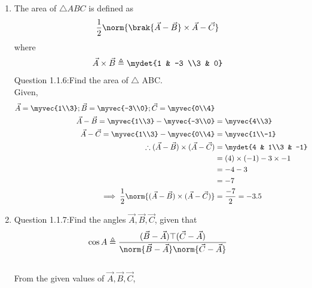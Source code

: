 \documentclass[11pt]{book}
\begin{document}
\begin{enumerate}[label=\thesection.\arabic*.,ref=\thesection.\theenumi]
\item The area of $\triangle ABC$ is defined as
		\begin{align}
			\frac{1}{2}\norm{{\brak{\vec{A}-\vec{B}}\times {\vec{A}-\vec{C}}}}
		\end{align}
		where
		\begin{align}
			\vec{A}\times\vec{B} \triangleq \mydet{1 & -3 \\3 & 0}
		\end{align}
Question 1.1.6:Find the area of $\triangle$ ABC.\\
\solution
Given,
\begin{align}
\vec{A} = \myvec{1\\3};
\vec{B} = \myvec{-3\\0};
\vec{C} = \myvec{0\\4}\\
\vec{A}-\vec{B}=\myvec{1\\3}-\myvec{-3\\0}&=\myvec{4\\3}\\
\vec{A}-\vec{C}=\myvec{1\\3}-\myvec{0\\4}&=\myvec{1\\-1}\\
\therefore(\vec{A}-\vec{B})\times(\vec{A}-\vec{C}) &=\mydet{4 & 1\\3 & -1}\\
	&=(4)\times (-1)- 3\times -1\\&= -4-3\\&=-7\\
\implies\frac{1}{2}\norm{(\vec{A}-\vec{B})\times(\vec{A}-\vec{C})}&=\frac{-7}{2}= -3.5
\end{align}


\item
Question 1.1.7:Find the angles $\vec{A},\vec{B},\vec{C}$, given that 
\begin{align}
	\cos{A} \triangleq \frac{(\vec{B}-\vec{A})\top(\vec{C}-\vec{A})}{\norm{\vec{B}-\vec{A}}\norm{\vec{C}-\vec{A}}}
\end{align}
\solution 
\\
From the given values of $\vec{A},\vec{B},\vec{C}$,\\
\begin{enumerate}


\end{enumerate}
\end{enumerate}
\end{document}
